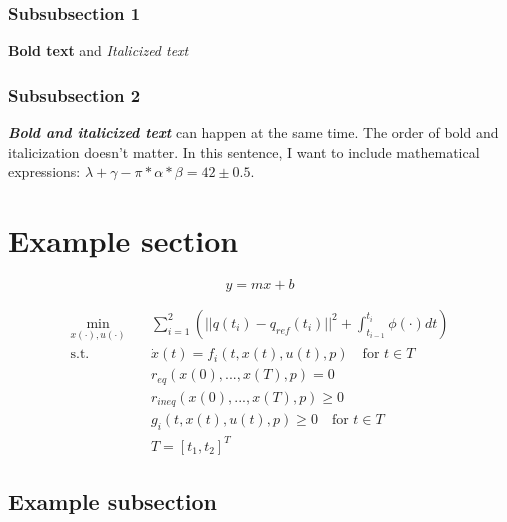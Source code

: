 \documentclass[a4paper, 10pt, journal]{KIT-HCR-Report-IEEE}      %
\begin{document}
\subsubsection{Subsubsection 1}

\textbf{Bold text} and \textit{Italicized text}

\subsubsection{Subsubsection 2}
\textbf{\textit{Bold and italicized text}} can happen at the same time. The order of bold and italicization doesn't matter. In this sentence, I want to include mathematical expressions: \(\lambda + \gamma - \pi*\alpha*\beta = 42 \pm 0.5 \).

\section{Example section}
\lipsum[1]

\begin{equation}
    y = mx + b
    \label{eqn:linear}
\end{equation}

\begin{subequations}
    \begin{align}
        \min_{x(\cdot),u(\cdot)} \quad & \sum_{i=1}^{2} \left( ||q(t_i) - q_{ref}(t_i)||^2 + \int_{{t}_{i-1}}^{{t}_{i}} {\phi(\cdot)dt} \right) \label{ma_ocp_objfunc} \\
        \textrm{s.t.} \quad & \dot{x}(t) = f_{i}(t, x(t), u(t), p) \quad \textrm{for } t \in T \label{ma_ocp_eom}\\
         & r_{eq}(x(0), ..., x(T), p) = 0 \label{ma_ocp_req}\\
         & r_{ineq}(x(0), ..., x(T), p) \geq 0 \label{ma_ocp_rineq}\\
         & g_{i}(t, x(t), u(t), p) \geq 0 \quad \textrm{for } t \in T \label{ma_ocp_g}\\
         & T = [t_1, t_2]^T \label{T}
    \end{align}
    \label{eqn:ma_ocp}
\end{subequations}

\subsection{Example subsection}
\lipsum[2]
\end{document}
